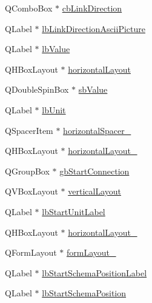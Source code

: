 \begin{DoxyCompactItemize}
\item 
Q\-Combo\-Box $\ast$ \hyperlink{class_ui__mdt_cl_unit_link_dialog_a0ce7ebc2f08ada01ae0108d72a8fd743}{cb\-Link\-Direction}
\item 
Q\-Label $\ast$ \hyperlink{class_ui__mdt_cl_unit_link_dialog_aaa9992fad9b3f06e4305151ab66c0e26}{lb\-Link\-Direction\-Ascii\-Picture}
\item 
Q\-Label $\ast$ \hyperlink{class_ui__mdt_cl_unit_link_dialog_a923599f5b3f89437483b1a396f6036d9}{lb\-Value}
\item 
Q\-H\-Box\-Layout $\ast$ \hyperlink{class_ui__mdt_cl_unit_link_dialog_a36aaec1c29ec158309c200a47d2eb548}{horizontal\-Layout}
\item 
Q\-Double\-Spin\-Box $\ast$ \hyperlink{class_ui__mdt_cl_unit_link_dialog_ac580c8a87b8a782c115e955752038e6a}{sb\-Value}
\item 
Q\-Label $\ast$ \hyperlink{class_ui__mdt_cl_unit_link_dialog_ac5ea1fe529ad3b837ed545c823f81e92}{lb\-Unit}
\item 
Q\-Spacer\-Item $\ast$ \hyperlink{class_ui__mdt_cl_unit_link_dialog_af0a01b6d7829c2312014e64e1f8c8df8}{horizontal\-Spacer\-\_}
\item 
Q\-H\-Box\-Layout $\ast$ \hyperlink{class_ui__mdt_cl_unit_link_dialog_a3c81feb5dea7610dda050d9a69ae7b99}{horizontal\-Layout\-\_}
\item 
Q\-Group\-Box $\ast$ \hyperlink{class_ui__mdt_cl_unit_link_dialog_a228dc3f2c9fc5406ce6dbb015c72bb72}{gb\-Start\-Connection}
\item 
Q\-V\-Box\-Layout $\ast$ \hyperlink{class_ui__mdt_cl_unit_link_dialog_ad145ca2439a0b474b568006bff51b134}{vertical\-Layout}
\item 
Q\-Label $\ast$ \hyperlink{class_ui__mdt_cl_unit_link_dialog_a721948d531221588edac25a79038b475}{lb\-Start\-Unit\-Label}
\item 
Q\-H\-Box\-Layout $\ast$ \hyperlink{class_ui__mdt_cl_unit_link_dialog_ad1e38f2bd431aec80de9fee9903c447a}{horizontal\-Layout\-\_}
\item 
Q\-Form\-Layout $\ast$ \hyperlink{class_ui__mdt_cl_unit_link_dialog_aaeb7395111f2a045b8271eb6124157c9}{form\-Layout\-\_}
\item 
Q\-Label $\ast$ \hyperlink{class_ui__mdt_cl_unit_link_dialog_aa6dd9f92aea5eb3cea8e3b24b6e11e4f}{lb\-Start\-Schema\-Position\-Label}
\item 
Q\-Label $\ast$ \hyperlink{class_ui__mdt_cl_unit_link_dialog_a74c83cf4c55cf0f2c6a620d9b4eb797b}{lb\-Start\-Schema\-Position}
\item 

\end{DoxyCompactItemize}
